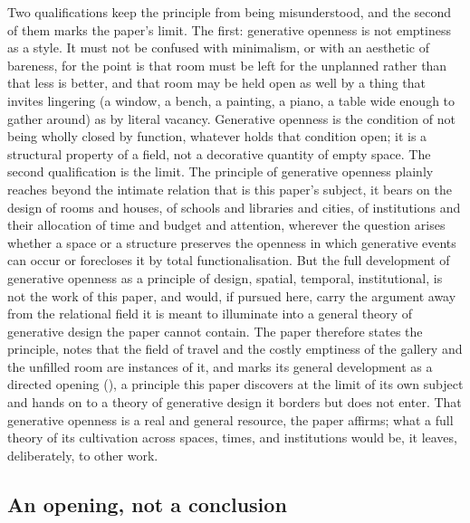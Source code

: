 Two qualifications keep the principle from being misunderstood, and the second of them marks the paper's limit. The first: generative openness is not emptiness as a style. It must not be confused with minimalism, or with an aesthetic of bareness, for the point is that room must be left for the unplanned rather than that less is better, and that room may be held open as well by a thing that invites lingering (a window, a bench, a painting, a piano, a table wide enough to gather around) as by literal vacancy. Generative openness is the condition of not being wholly closed by function, whatever holds that condition open; it is a structural property of a field, not a decorative quantity of empty space. The second qualification is the limit. The principle of generative openness plainly reaches beyond the intimate relation that is this paper's subject, it bears on the design of rooms and houses, of schools and libraries and cities, of institutions and their allocation of time and budget and attention, wherever the question arises whether a space or a structure preserves the openness in which generative events can occur or forecloses it by total functionalisation. But the full development of generative openness as a principle of design, spatial, temporal, institutional, is not the work of this paper, and would, if pursued here, carry the argument away from the relational field it is meant to illuminate into a general theory of generative design the paper cannot contain. The paper therefore states the principle, notes that the field of travel and the costly emptiness of the gallery and the unfilled room are instances of it, and marks its general development as a directed opening (), a principle this paper discovers at the limit of its own subject and hands on to a theory of generative design it borders but does not enter. That generative openness is a real and general resource, the paper affirms; what a full theory of its cultivation across spaces, times, and institutions would be, it leaves, deliberately, to other work.

\subsection{An opening, not a conclusion}
\label{p21:sub:gen-opening}


